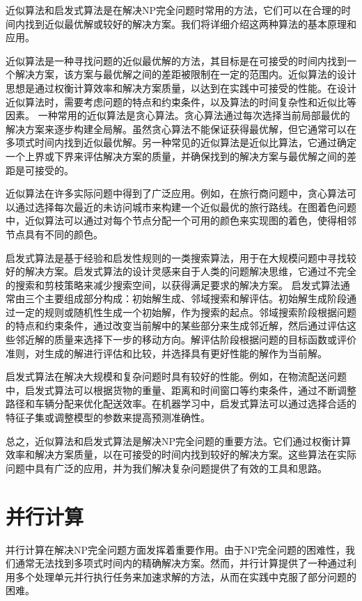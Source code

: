 \documentclass[UTF8,openany,zihao=5]{ctexbook}
\begin{document}
近似算法和启发式算法是在解决NP完全问题时常用的方法，它们可以在合理的时间内找到近似最优解或较好的解决方案。我们将详细介绍这两种算法的基本原理和应用。

近似算法是一种寻找问题的近似最优解的方法，其目标是在可接受的时间内找到一个解决方案，该方案与最优解之间的差距被限制在一定的范围内。近似算法的设计思想是通过权衡计算效率和解决方案质量，以达到在实践中可接受的性能。在设计近似算法时，需要考虑问题的特点和约束条件，以及算法的时间复杂性和近似比等因素。
一种常用的近似算法是贪心算法。贪心算法通过每次选择当前局部最优的解决方案来逐步构建全局解。虽然贪心算法不能保证获得最优解，但它通常可以在多项式时间内找到近似最优解。另一种常见的近似算法是近似比算法，它通过确定一个上界或下界来评估解决方案的质量，并确保找到的解决方案与最优解之间的差距是可接受的。

近似算法在许多实际问题中得到了广泛应用。例如，在旅行商问题中，贪心算法可以通过选择每次最近的未访问城市来构建一个近似最优的旅行路线。在图着色问题中，近似算法可以通过对每个节点分配一个可用的颜色来实现图的着色，使得相邻节点具有不同的颜色。

启发式算法是基于经验和启发性规则的一类搜索算法，用于在大规模问题中寻找较好的解决方案。启发式算法的设计灵感来自于人类的问题解决思维，它通过不完全的搜索和剪枝策略来减少搜索空间，以获得满足要求的解决方案。
启发式算法通常由三个主要组成部分构成：初始解生成、邻域搜索和解评估。初始解生成阶段通过一定的规则或随机性生成一个初始解，作为搜索的起点。邻域搜索阶段根据问题的特点和约束条件，通过改变当前解中的某些部分来生成邻近解，然后通过评估这些邻近解的质量来选择下一步的移动方向。解评估阶段根据问题的目标函数或评价准则，对生成的解进行评估和比较，并选择具有更好性能的解作为当前解。

启发式算法在解决大规模和复杂问题时具有较好的性能。例如，在物流配送问题中，启发式算法可以根据货物的重量、距离和时间窗口等约束条件，通过不断调整路径和车辆分配来优化配送效率。在机器学习中，启发式算法可以通过选择合适的特征子集或调整模型的参数来提高预测准确性。

总之，近似算法和启发式算法是解决NP完全问题的重要方法。它们通过权衡计算效率和解决方案质量，以在可接受的时间内找到较好的解决方案。这些算法在实际问题中具有广泛的应用，并为我们解决复杂问题提供了有效的工具和思路。

\section{并行计算}

并行计算在解决NP完全问题方面发挥着重要作用。由于NP完全问题的困难性，我们通常无法找到多项式时间内的精确解决方案。然而，并行计算提供了一种通过利用多个处理单元并行执行任务来加速求解的方法，从而在实践中克服了部分问题的困难。
\end{document}
